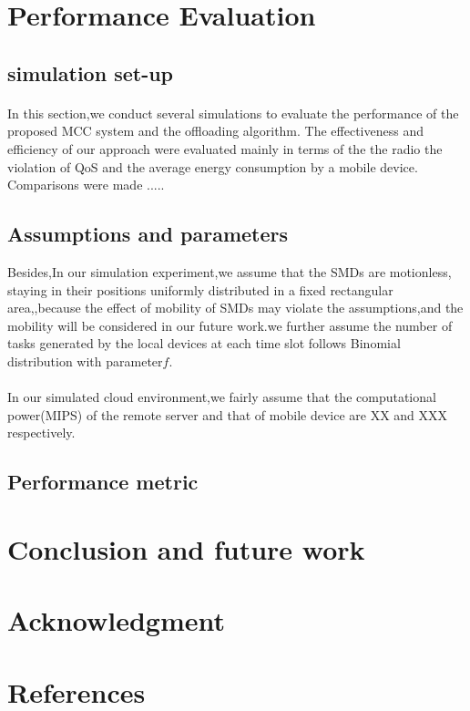 \documentclass[review]{elsarticle}
\begin{document}
    \paragraph{}
\section{Performance Evaluation}
\subsection{simulation set-up}
\paragraph{} In this section,we conduct several simulations to evaluate the performance of the proposed MCC system and the offloading algorithm. The effectiveness and efficiency of our approach were evaluated mainly in terms of the the radio the violation of QoS and the average energy consumption by a mobile device. Comparisons were made .....%
\subsection{Assumptions and parameters}
Besides,In our simulation experiment,we assume that the SMDs are motionless, staying in their positions uniformly distributed in a fixed rectangular area,\cite{vellore2009performance},because the effect of mobility of SMDs may violate the assumptions,and the mobility will be considered in our future work.we further assume the number of tasks generated by the local devices at each time slot follows Binomial distribution with parameter$f$.
\paragraph{}
In our simulated cloud environment,we fairly assume that the computational power(MIPS) of the remote server and that of mobile device are XX and XXX respectively.
\subsection{Performance metric}
\section{Conclusion and future work}
\section{Acknowledgment}
\section*{References}


\end{document}
